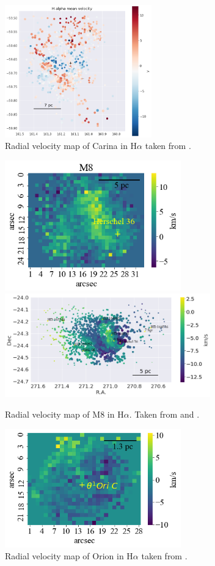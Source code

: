\documentclass[fleqn,usenatbib, useAMS, a4paper]{mnras}
\begin{document}
\begin{figure}
\centering 
\includegraphics[width=2.5in]{Figures/Car}
\caption{Radial velocity map of Carina in H$\alpha$ taken from \cite{Damiani:2016a}.}
\label{fig:MCar}
\end{figure}

\begin{figure}
\centering 
\includegraphics[width=3in]{Figures/M8H.png}
\includegraphics[width=3.5in]{Figures/M8}
\caption{Radial velocity map of M8 in H$\alpha$. Taken from \citep{Damiani:2017b} and \cite{1987A&A...176..338H}.}
\label{fig:MM8}
\end{figure}

\begin{figure}
\centering 
\includegraphics[width=3in]{Figures/OrionL}
\caption{Radial velocity map of Orion in H$\alpha$ taken from \cite{1987A&A...176..347H}.}
\label{fig:MOrion}
\end{figure}
\end{document}
